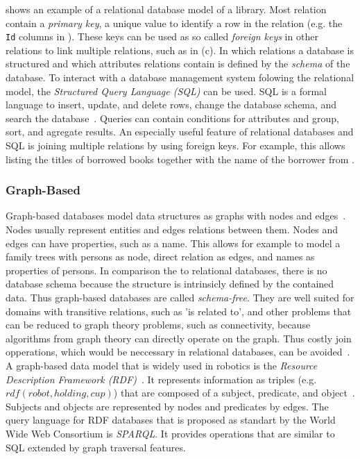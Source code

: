  shows an example of a relational
database model of a library. Most relation contain a \emph{primary
  key}, a unique value to identify a row in the relation (e.g. the
\texttt{Id} columns in ). These keys
can be used as so called \emph{foreign keys} in other relations to
link multiple relations, such as in
(c). In which relations a database is
structured and which attributes relations contain is defined by the
\emph{schema} of the database. To interact with a database management
system folowing the relational model, the \emph{Structured Query
  Language (SQL)} can be used. SQL is a formal language to insert,
update, and delete rows, change the database schema, and search the
database~\cite{database-def}. Queries can contain conditions for
attributes and group, sort, and agregate results. An especially useful
feature of relational databases and SQL is joining multiple relations
by using foreign keys. For example, this allows listing the titles of
borrowed books together with the name of the borrower from
.

\subsubsection{Graph-Based}
\label{sec:graph-design}
Graph-based databases model data structures as graphs with nodes and
edges~\cite{graphdbs}. Nodes usually represent entities and edges
relations between them. Nodes and edges can have properties, such as a
name. This allows for example to model a family trees with persons as
node, direct relation as edges, and names as properties of persons. In
comparison the to relational databases, there is no database schema
because the structure is intrinsicly defined by the contained
data. Thus graph-based databases are called \emph{schema-free}. They
are well suited for domains with transitive relations, such as 'is
related to', and other problems that can be reduced to graph theory
problems, such as connectivity, because algorithms from graph theory
can directly operate on the graph. Thus costly join opperations, which
would be neccessary in relational databases, can be
avoided~\cite{graphcomparison}. A graph-based data model that is
widely used in robotics is the \emph{Resource Description Framework
  (RDF)}~\cite{KnowRob-Representation,Oro,OpenEASE}. It represents
information as triples (e.g. $rdf(robot, holding, cup)$) that are
composed of a subject, predicate, and object~\cite{rdf}. Subjects and
objects are represented by nodes and predicates by edges. The query
language for RDF databases that is proposed as standart by the World
Wide Web Consortium is \emph{SPARQL}. It provides operations that are
similar to SQL extended by graph traversal features.


